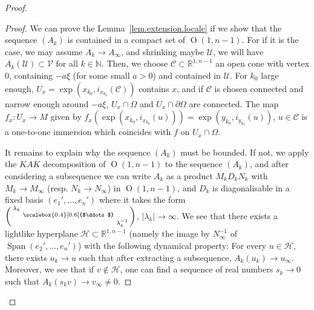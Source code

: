 \documentclass[11pt]{article}
\theoremstyle{definition}
\numberwithin{equation}{section}
\numberwithin{figure}{section}
\numberwithin{table}{section}
\DeclareMathOperator{\Omp}{O}%
\DeclareMathOperator{\Span}{Span}
\newcommand*\NN{\mathbb{N}}
\newcommand*\RR{\mathbb{R}}
\newenvironment{smallpmatrix}{\left(\begin{smallmatrix}}{\end{smallmatrix}\right)}
\begin{document}
\begin{proof}
\begin{proof}
We can prove the Lemma~\ref{lem.extension.locale} if we show that the sequence $(A_k)$ is contained in a compact set of $\Omp(1,n-1)$. For if it is the case, we may assume $A_k \to A_{\infty}$, and shrinking maybe $\mathcal{U}$, we will have $A_k(\mathcal{U}) \subset \mathcal{V}$ for all $k \in \NN$. Then, we choose ${\mathcal C} \subset \RR^{1,n-1}$ an open cone with vertex $0$, containing $-a\xi$ (for some small $a>0$) and contained in ${\mathcal U}$. For $k_0$ large enough, $U_x=\exp(x_{k_0}, i_{x_{k_0}}({\mathcal C}))$ contains $x$, and if ${\mathcal C}$ is chosen connected and narrow enough around $-a\xi$, $U_x \cap \Omega$ and $U_x \cap \partial \Omega$ are connected. The map $f_x : U_x \to M$ given by $f_x(\exp(x_{k_0},i_{x_{k_0}}(u)))=\exp(y_{k_0},i_{y_{k_0}}(u))$, $u \in {\mathcal C}$ is a one-to-one immersion which coincides with $f$ on $U_x \cap \Omega$.

It remains to explain why the sequence $(A_k)$ must be bounded. If not, we apply the $KAK$ decomposition of $\Omp(1,n-1)$ to the sequence $(A_k)$, and after considering a subsequence we can write $A_k$ as a product $M_kD_kN_k$ with $M_k \to M_{\infty}$ (resp. $N_k \to N_{\infty}$) in $\Omp(1,n-1)$, and $D_k$ is diagonalisable in a fixed basis $(e_1',\ldots,e_n')$ where it takes the form $
\begin{smallpmatrix} \lambda_k & & \\
& \scalebox{0.4}[0.6]{$\ddots$} & \\
& & \lambda_k^{-1}\\
\end{smallpmatrix} $, $|\lambda_k| \to \infty$. We see that there exists a lightlike hyperplane ${\mathcal H} \subset \RR^{1,n-1}$ (namely the image by $N_{\infty}^{-1}$ of $\Span(e_2',\ldots,e_n')$) with the following dynamical property: For every $u \in {\mathcal H}$, there exists $u_k \to u$ such that after extracting a subsequence, $A_k(u_k) \to u_{\infty}$. Moreover, we see that if $v \not \in {\mathcal H}$, one can find a sequence of real numbers $s_k \to 0$ such that $A_k(s_kv) \to v_{\infty} \not = 0$.


\end{proof}
\end{proof}
\end{document}
